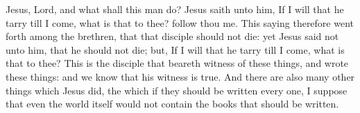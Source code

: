 Jesus, Lord, and what shall this man do? Jesus saith unto him, If I will that he tarry till I come, what is that to thee? follow thou me. This saying therefore went forth among the brethren, that that disciple should not die: yet Jesus said not unto him, that he should not die; but, If I will that he tarry till I come, what is that to thee?  This is the disciple that beareth witness of these things, and wrote these things: and we know that his witness is true.  And there are also many other things which Jesus did, the which if they should be written every one, I suppose that even the world itself would not contain the books that should be written. 